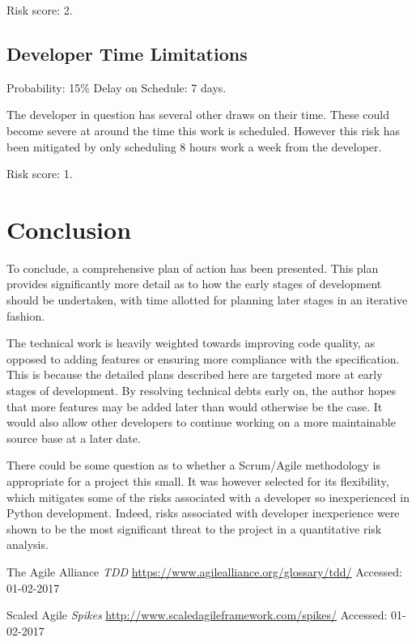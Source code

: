 \documentclass[a4paper,12pt]{article}
\begin{document}
Risk score: 2.

\subsection{Developer Time Limitations}
Probability: 15\% \hfill Delay on Schedule: 7 days.

The developer in question has several other draws on their time. These could become severe at around the time this work is scheduled. However this risk has been mitigated by only scheduling 8 hours work a week from the developer.

Risk score: 1.


\section{Conclusion}

To conclude, a comprehensive plan of action has been presented. This plan provides significantly more detail as to how the early stages of development should be undertaken, with time allotted for planning later stages in an iterative fashion.

The technical work is heavily weighted towards improving code quality, as opposed to adding features or ensuring more compliance with the specification. This is because the detailed plans described here are targeted more at early stages of development. By resolving technical debts early on, the author hopes that more features may be added later than would otherwise be the case. It would also allow other developers to continue working on a more maintainable source base at a later date.

There could be some question as to whether a Scrum/Agile methodology is appropriate for a project this small. It was however selected for its flexibility, which mitigates some of the risks associated with a developer so inexperienced in Python development. Indeed, risks associated with developer inexperience were shown to be the most significant threat to the project in a quantitative risk analysis.


\begin{thebibliography}{}

The Agile Alliance
\textit{TDD}
\url{https://www.agilealliance.org/glossary/tdd/}
Accessed: 01-02-2017


Scaled Agile
\textit{Spikes}
\url{http://www.scaledagileframework.com/spikes/}
Accessed: 01-02-2017


\end{thebibliography}
\end{document}
